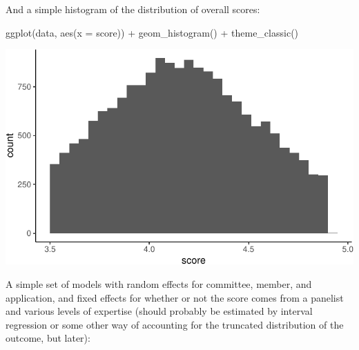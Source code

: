 \documentclass[
  letterpaper,
  DIV=11,
  numbers=noendperiod]{scrartcl}
\newenvironment{Shaded}{\begin{snugshade}}{\end{snugshade}}
\newcommand{\AttributeTok}[1]{\textcolor[rgb]{0.40,0.45,0.13}{#1}}
\newcommand{\FunctionTok}[1]{\textcolor[rgb]{0.28,0.35,0.67}{#1}}
\newcommand{\NormalTok}[1]{\textcolor[rgb]{0.00,0.23,0.31}{#1}}
\newcommand{\SpecialCharTok}[1]{\textcolor[rgb]{0.37,0.37,0.37}{#1}}
\begin{document}
And a simple histogram of the distribution of overall scores:

\begin{Shaded}
\begin{Highlighting}[]
\FunctionTok{ggplot}\NormalTok{(data, }\FunctionTok{aes}\NormalTok{(}\AttributeTok{x =}\NormalTok{ score)) }\SpecialCharTok{+} \FunctionTok{geom\_histogram}\NormalTok{() }\SpecialCharTok{+}
         \FunctionTok{theme\_classic}\NormalTok{()}
\end{Highlighting}
\end{Shaded}

\includegraphics{sim-data_files/figure-pdf/unnamed-chunk-4-1.pdf}

A simple set of models with random effects for committee, member, and
application, and fixed effects for whether or not the score comes from a
panelist and various levels of expertise (should probably be estimated
by interval regression or some other way of accounting for the truncated
distribution of the outcome, but later):
\end{document}
